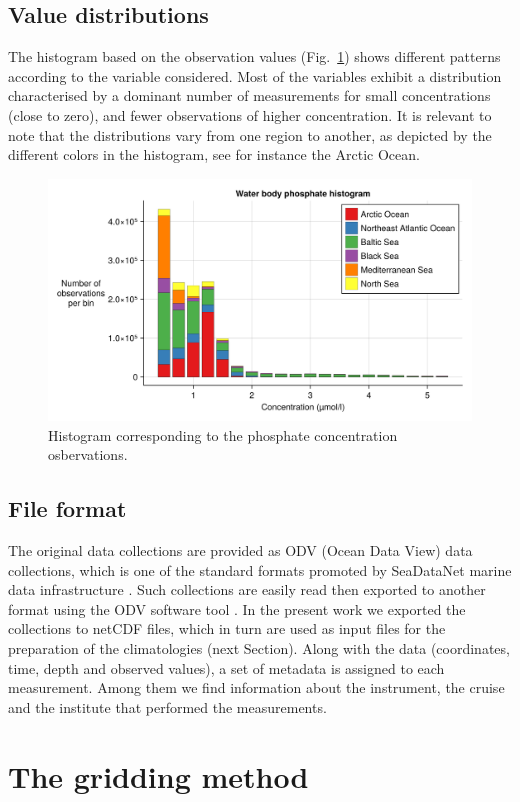 \documentclass[essd, manuscript]{copernicus}
\begin{document}
\subsection{Value distributions}

The histogram based on the observation values (Fig.~\ref{fig:histogram_value_Water_body_phosphate}) shows different patterns according to the variable considered. Most of the variables exhibit a distribution characterised by a dominant number of measurements for small concentrations (close to zero), and fewer observations of higher concentration. It is relevant to note that the distributions vary from one region to another, as depicted by the different colors in the histogram, see for instance the Arctic Ocean.

\begin{figure}[t]
\centering
\includegraphics[width=.5\textwidth]{histogram_value_Water_body_phosphate.png}
\caption{Histogram corresponding to the phosphate concentration osbervations.\label{fig:histogram_value_Water_body_phosphate}}
\end{figure}


\subsection{File format}

The original data collections are provided as ODV (Ocean Data View) data collections, which is one of the standard formats promoted by SeaDataNet marine data infrastructure \citep{Lowry2023}. Such collections are easily read then exported to another format using the ODV software tool \citep{SCHLITZER2002}. In the present work we exported the collections to netCDF files, which in turn are used as input files for the preparation of the climatologies (next Section). Along with the data (coordinates, time, depth and observed values), a set of metadata is assigned to each measurement. Among them we find information about the instrument, the cruise and the institute that performed the measurements. 

\section{The gridding method\label{sec:method}}
\end{document}
